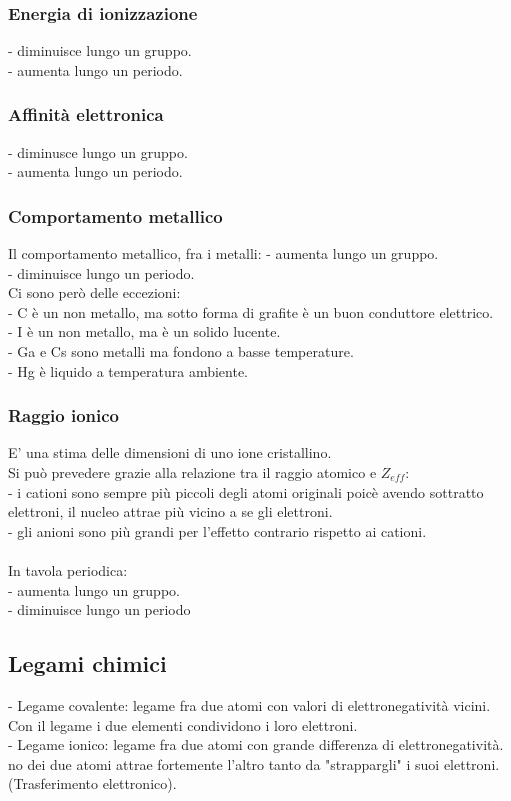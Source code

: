 \subsubsection{Energia di ionizzazione}
- diminuisce lungo un gruppo.\\
- aumenta lungo un periodo.
\subsubsection{Affinità elettronica}
- diminusce lungo un gruppo.\\
- aumenta lungo un periodo.
\subsubsection{Comportamento metallico}
Il comportamento metallico, fra i metalli:
- aumenta lungo un gruppo.\\
- diminuisce lungo un periodo.\\
Ci sono però delle eccezioni:\\
- C è un non metallo, ma sotto forma di grafite è un buon conduttore elettrico.\\
- I è un non metallo, ma è un solido lucente.\\
- Ga e Cs sono metalli ma fondono a basse temperature.\\
- Hg è liquido a temperatura ambiente.
\subsubsection{Raggio ionico}
E' una stima delle dimensioni di uno ione cristallino.\\
Si può prevedere grazie alla relazione tra il raggio atomico e $Z_{eff}$:\\
- i cationi sono sempre più piccoli degli atomi originali poicè avendo sottratto elettroni, il nucleo attrae più vicino a se gli elettroni.\\
- gli anioni sono più grandi per l'effetto contrario rispetto ai cationi.\\\\
In tavola periodica:\\
- aumenta lungo un gruppo.\\
- diminuisce lungo un periodo
\subsection{Legami chimici}
- Legame covalente: legame fra due atomi con valori di elettronegatività vicini. Con il legame i due elementi condividono i loro elettroni.\\
- Legame ionico: legame fra due atomi con grande differenza di elettronegatività. no dei due atomi attrae fortemente l'altro tanto da "strappargli" i suoi elettroni. (Trasferimento elettronico).
